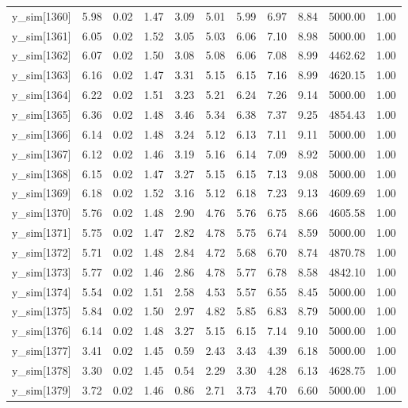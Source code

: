 \begin{table}[ht]
\begin{tabular}{rrrrrrrrrrr}
  y\_sim[1360] & 5.98 & 0.02 & 1.47 & 3.09 & 5.01 & 5.99 & 6.97 & 8.84 & 5000.00 & 1.00 \\ 
  y\_sim[1361] & 6.05 & 0.02 & 1.52 & 3.05 & 5.03 & 6.06 & 7.10 & 8.98 & 5000.00 & 1.00 \\ 
  y\_sim[1362] & 6.07 & 0.02 & 1.50 & 3.08 & 5.08 & 6.06 & 7.08 & 8.99 & 4462.62 & 1.00 \\ 
  y\_sim[1363] & 6.16 & 0.02 & 1.47 & 3.31 & 5.15 & 6.15 & 7.16 & 8.99 & 4620.15 & 1.00 \\ 
  y\_sim[1364] & 6.22 & 0.02 & 1.51 & 3.23 & 5.21 & 6.24 & 7.26 & 9.14 & 5000.00 & 1.00 \\ 
  y\_sim[1365] & 6.36 & 0.02 & 1.48 & 3.46 & 5.34 & 6.38 & 7.37 & 9.25 & 4854.43 & 1.00 \\ 
  y\_sim[1366] & 6.14 & 0.02 & 1.48 & 3.24 & 5.12 & 6.13 & 7.11 & 9.11 & 5000.00 & 1.00 \\ 
  y\_sim[1367] & 6.12 & 0.02 & 1.46 & 3.19 & 5.16 & 6.14 & 7.09 & 8.92 & 5000.00 & 1.00 \\ 
  y\_sim[1368] & 6.15 & 0.02 & 1.47 & 3.27 & 5.15 & 6.15 & 7.13 & 9.08 & 5000.00 & 1.00 \\ 
  y\_sim[1369] & 6.18 & 0.02 & 1.52 & 3.16 & 5.12 & 6.18 & 7.23 & 9.13 & 4609.69 & 1.00 \\ 
  y\_sim[1370] & 5.76 & 0.02 & 1.48 & 2.90 & 4.76 & 5.76 & 6.75 & 8.66 & 4605.58 & 1.00 \\ 
  y\_sim[1371] & 5.75 & 0.02 & 1.47 & 2.82 & 4.78 & 5.75 & 6.74 & 8.59 & 5000.00 & 1.00 \\ 
  y\_sim[1372] & 5.71 & 0.02 & 1.48 & 2.84 & 4.72 & 5.68 & 6.70 & 8.74 & 4870.78 & 1.00 \\ 
  y\_sim[1373] & 5.77 & 0.02 & 1.46 & 2.86 & 4.78 & 5.77 & 6.78 & 8.58 & 4842.10 & 1.00 \\ 
  y\_sim[1374] & 5.54 & 0.02 & 1.51 & 2.58 & 4.53 & 5.57 & 6.55 & 8.45 & 5000.00 & 1.00 \\ 
  y\_sim[1375] & 5.84 & 0.02 & 1.50 & 2.97 & 4.82 & 5.85 & 6.83 & 8.79 & 5000.00 & 1.00 \\ 
  y\_sim[1376] & 6.14 & 0.02 & 1.48 & 3.27 & 5.15 & 6.15 & 7.14 & 9.10 & 5000.00 & 1.00 \\ 
  y\_sim[1377] & 3.41 & 0.02 & 1.45 & 0.59 & 2.43 & 3.43 & 4.39 & 6.18 & 5000.00 & 1.00 \\ 
  y\_sim[1378] & 3.30 & 0.02 & 1.45 & 0.54 & 2.29 & 3.30 & 4.28 & 6.13 & 4628.75 & 1.00 \\ 
  y\_sim[1379] & 3.72 & 0.02 & 1.46 & 0.86 & 2.71 & 3.73 & 4.70 & 6.60 & 5000.00 & 1.00 \\ 

\end{tabular}
\end{table}
